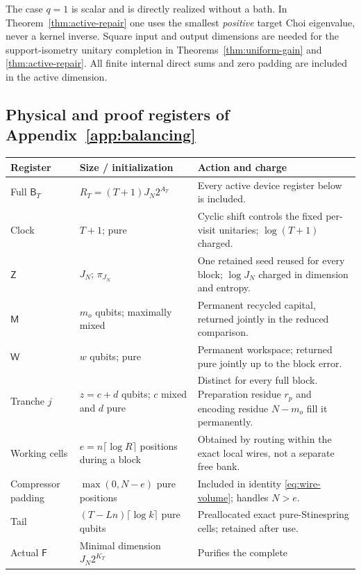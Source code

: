 \documentclass[11pt,a4paper]{article}
\numberwithin{equation}{section}
\theoremstyle{plain}
\theoremstyle{definition}
\newcommand{\rg}[1]{\mathsf{#1}}
\begin{document}
The case $q=1$ is scalar and is directly realized without a bath. In
Theorem~\ref{thm:active-repair} one uses the smallest \emph{positive} target
Choi eigenvalue, never a kernel inverse. Square input and output dimensions
are needed for the support-isometry unitary completion in
Theorems~\ref{thm:uniform-gain} and \ref{thm:active-repair}. All finite
internal direct sums and zero padding are included in the active dimension.

\subsection{Physical and proof registers of Appendix~\ref{app:balancing}}

\begin{center}
\small
\begin{tabular}{@{}>{\raggedright\arraybackslash}p{2.6cm}>{\raggedright\arraybackslash}p{4.0cm}>{\raggedright\arraybackslash}p{7.8cm}@{}}
\hline
\textbf{Register} & \textbf{Size / initialization} & \textbf{Action and charge}\\
\hline
Full $\rg{B}_T$ & $R_T=(T+1)J_N2^{A_T}$ & Every active device register below
is included.\\
Clock & $T+1$; pure & Cyclic shift controls the fixed per-visit unitaries;
$\log(T+1)$ charged.\\
$\rg{Z}$ & $J_N$; $\pi_{J_N}$ & One retained seed reused for every block;
$\log J_N$ charged in dimension and entropy.\\
$\rg{M}$ & $m_o$ qubits; maximally mixed & Permanent recycled capital,
returned jointly in the reduced comparison.\\
$\rg{W}$ & $w$ qubits; pure & Permanent workspace; returned pure jointly up to
the block error.\\
Tranche $j$ & $z=c+d$ qubits; $c$ mixed and $d$ pure & Distinct for every full
block. Preparation residue $r_p$ and encoding residue $N-m_o$ fill it
permanently.\\
Working cells & $e=n\lceil\log R\rceil$ positions during a block & Obtained by
routing within the exact local wires, not a separate free bank.\\
Compressor padding & $\max(0,N-e)$ pure positions & Included in identity
\eqref{eq:wire-volume}; handles $N>e$.\\
Tail & $(T-Ln)\lceil\log k\rceil$ pure qubits & Preallocated exact
pure-Stinespring cells; retained after use.\\
Actual $\rg{F}$ & Minimal dimension $J_N2^{K_T}$ & Purifies the complete

\end{tabular}
\end{center}
\end{document}
